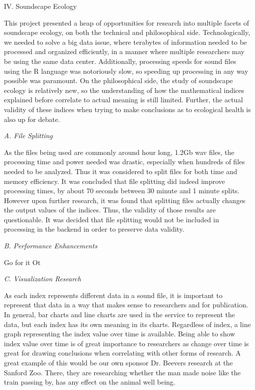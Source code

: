 \begin{center}
IV. Soundscape Ecology
\end{center}
\begin{flushleft}
\setlength{\parindent}{0.125in}
This project presented a heap of opportunities for research into multiple facets of soundscape ecology, on both the technical and philosophical side. Technologically, we needed to solve a big data issue, where terabytes of information needed to be processed and organized efficiently, in a manner where multiple researchers may be using the same data center. Additionally, processing speeds for sound files using the R language was notoriously slow, so speeding up processing in any way possible was paramount. On the philosophical side, the study of soundscape ecology is relatively new, so the understanding of how the mathematical indices explained before correlate to actual meaning is still limited. Further, the actual validity of these indices when trying to make conclusions as to ecological health is also up for debate.\par

\noindent\textit{A. File Splitting}\par
As the files being used are commonly around hour long, 1.2Gb wav files, the processing time and power needed was drastic, especially when hundreds of files needed to be analyzed. Thus it was considered to split files for both time and memory efficiency. It was concluded that file splitting did indeed improve processing times, by about 70 seconds between 30 minute and 1 minute splits. However upon further research, it was found that splitting files actually changes the output values of the indices. Thus, the validity of those results are questionable. It was decided that file splitting would not be included in processing in the backend in order to preserve data validity.\par

\noindent\textit{B. Performance Enhancements}\par
Go for it Ot\par

\noindent\textit{C. Visualization Research}\par
As each index represents different data in a sound file, it is important to represent that data in a way that makes sense to researchers and for publication. In general, bar charts and line charts are used in the service to represent the data, but each index has its own meaning in its charts. Regardless of index, a line graph representing the index value over time is available. Being able to show index value over time is of great importance to researchers as change over time is great for drawing conclusions when correlating with other forms of research. A great example of this would be our own sponsor Dr. Beever\textquotesingle s research at the Sanford Zoo. There, they are researching whether the man made noise like the train passing by, has any effect on the animal well being.

\end{flushleft}
